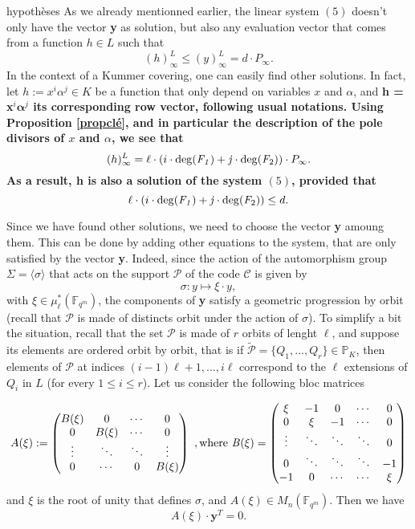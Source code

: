 \documentclass[10pt]{article}
\newcommand{\s}{\vspace{0.3cm}}
\newcommand{\cd}{\cdot}
\newcommand{\PP}{\mathbb{P}}
\newcommand{\fqm}{\mathbb{F}_{q^m}}
\newcommand{\PR}{\mathcal{P}}
\begin{document}
\s
hypothèses
As we already mentionned earlier, the linear system $(5)$ doesn't only have the vector \textbf{y} as solution, but also any evaluation vector that comes from a function $h \in L$ such that 
\[(h)^L_{\infty} \leq (y)^L_{\infty} = d \cd P_{\infty}.\]
In the context of a Kummer covering, one can easily find other solutions. In fact, let $h := x^i\alpha^j \in K$ be a function that only depend on variables $x$ and $\alpha$, and \bf{h} \rm = \textbf{x}$^i\boldsymbol{\alpha}^j$ \rm its corresponding row vector, following usual notations. Using Proposition \ref{propclé}, and in particular the description of the pole divisors of $x$ and $\alpha$, we see that 
\[ (h)^L_{\infty} = \ell \cd \left(i \cd \rm{deg}\it(F_1)+j \cd \rm{deg}\it(F_{\rm 2})\right) \cd P_{\infty}.\]
As a result, \bf{h} \rm is also a solution of the system $(5)$, provided that
\[\ell \cd \left(i \cd \rm{deg}\it(F_1)+j \cd \rm{deg}\it(F_{\rm 2})\right) \leq d.\]


\s

Since we have found other solutions, we need to choose the vector \textbf{y} amoung them. This can be done by adding other equations to the system, that are only satisfied by the vector \textbf{y}. Indeed, since the action of the automorphism group $\Sigma = \langle\sigma\rangle$ that acts on the support $\PR$ of the code $\mathcal{C}$ is given by 
\[\sigma : y \longmapsto \xi \cd y,\]
with $\xi \in \mu^*_{\ell}(\fqm)$, the components of \textbf{y} satisfy a geometric progression by orbit (recall that $\PR$ is made of distincts orbit under the action of $\sigma$). To simplify a bit the situation, recall that the set $\PR$ is made of $r$ orbits of lenght $\ell$, and suppose its elements are ordered orbit by orbit, that is if $\tilde{\PR} = \{Q_1,...,Q_r\} \in \PP_K$, then elements of $\PR$ at indices $(i-1)\ell+1,...,i\ell$ correspond to the $\ell$ extensions of $Q_{i}$ in $L$ (for every $1\leq i \leq r$). Let us consider the following bloc matrices

\begin{equation*} 
A(\xi) := 
\begin{pmatrix}
B(\xi) & 0 & \cdots & 0 \\
0 & B(\xi) & \cdots & 0 \\
\vdots & \ddots & \ddots & \vdots \\
0 & \cdots & 0 & B(\xi)
\end{pmatrix} \ , \rm where \it \ 
B(\xi) = 
\begin{pmatrix}
\xi & -1 & 0 & \cdots & 0 \\
0 & \xi & -1 & \cdots & 0 \\
\vdots & \ddots & \ddots & \ddots & 0 \\
0 & \ddots & \ddots & \ddots & -1 \\
-1 & 0 & \cdots & \cdots & \xi
\end{pmatrix}
\end{equation*}
and $\xi$ is the root of unity that defines $\sigma$, and $A(\xi) \in M_{n}(\fqm)$. Then we have
\begin{equation*}
A(\xi) \cd \textbf{y}^T
= 0.
\end{equation*}
\end{document}
